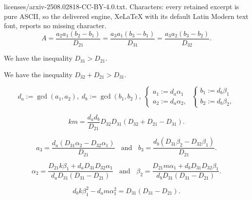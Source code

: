 \documentclass[10pt,a4paper]{amsart}
\begin{document}
licenses/arxiv-2508.02818-CC-BY-4.0.txt. Characters: every retained excerpt is pure ASCII, so the delivered engine, XeLaTeX with its default Latin Modern text font, reports no missing character.
\begin{equation} \label{basic3'}
A = \frac{a_2 a_1 (b_2 - b_1)}{D_{21}} = \frac{a_3 a_1 (b_3 - b_1)}{D_{31}} = \frac{a_3 a_2 (b_3 - b_2)}{D_{32}}.
\end{equation}

\begin{lem} \label{lem4}
We have the inequality $D_{31} > D_{21}$.
\end{lem}

\begin{lem} \label{lem5}
We have the inequality $D_{32} + D_{21} > D_{31}$.    
\end{lem}

\begin{equation} \label{definitions}
d_a := \gcd(a_1, a_2), \; d_b := \gcd(b_1, b_2), \; \left\{ \begin{array}{l}
a_1 := d_a \alpha_1 \\
a_2 := d_a \alpha_2,
\end{array} \right. \; 
\left\{ \begin{array}{l}
b_1 := d_b \beta_1 \\
b_2 := d_b \beta_2,
\end{array} \right.
\end{equation}

\begin{equation} \label{km-g}
k m = \frac{d_a d_b}{D_{21}}{D_{32} D_{31} (D_{32} +D_{21} - D_{31})} .
\end{equation}

\begin{equation} \label{a3b3}
a_3 = \frac{d_a (D_{31} \alpha_2 - D_{32} \alpha_1)}{D_{21}} \; \; \text{ and } \; \; b_3 = \frac{d_b (D_{31} \beta_2 - D_{32} \beta_1)}{D_{21}}.
\end{equation}

\begin{equation} \label{alpha2beta2}
\alpha_2 = \frac{D_{21} k \beta_1 + d_a D_{31} D_{32} \alpha_1}{d_a D_{31} (D_{31} - D_{21})} \; \; \text{ and } \; \; \beta_2 = \frac{D_{21} m \alpha_1 + d_b D_{31} D_{32} \beta_1}{d_b D_{31} (D_{31} - D_{21})}.
\end{equation}

\begin{equation} \label{pell-1-g}
d_b k \beta_1^2 - d_a m \alpha_1^2 = D_{31} (D_{31} - D_{21}).
\end{equation}
\end{document}
